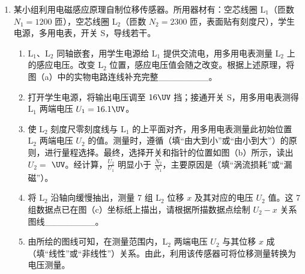 \documentclass[\gkver]{gaokaozhenti}
\begin{document}
\begin{enumerate}
\item
某小组利用电磁感应原理自制位移传感器。所用器材有：空芯线圈 $\mathrm{L}_1$（匝数 $N_1=1200$ 匝），空芯线圈 $\mathrm{L}_2$（匝数 $N_2=2300$ 匝，表面贴有刻度尺），学生电源，多用电表，开关 S，导线若干。
\begin{enumerate}
	\item
	$\mathrm{L}_1$、$\mathrm{L}_2$ 同轴嵌套，用学生电源给 $\mathrm{L}_1$ 提供交流电，用多用电表测量 $\mathrm{L}_2$ 上的感应电压。改变 $\mathrm{L}_2$ 位置，感应电压值会随之改变。根据上述原理，将图（a）中的实物电路连线补充完整\_\_\_\_\_\_\_\_。
	\item
	打开学生电源，将输出电压调至 $16\UV$ 挡；接通开关 S，用多用电表测得 $\mathrm{L}_1$ 两端电压 $U_1=16.1\UV$。
	\item
	使 $\mathrm{L}_2$ 刻度尺零刻度线与 $\mathrm{L}_1$ 的上平面对齐，用多用电表测量此初始位置 $\mathrm{L}_2$ 两端电压 $U_2$ 的值。测量时，遵循（填“由大到小”或“由小到大”）的原则，进行量程选择。最终，选择开关和指针的位置如图（b）所示，读出 $U_2=$ $\UV$。经计算，$\frac{U_2}{U_1}$ 明显小于 $\frac{N_2}{N_1}$，主要原因是（填“涡流损耗”或“漏磁”）。
	\item
	将 $\mathrm{L}_2$ 沿轴向缓慢抽出，测量 7 组 $\mathrm{L}_2$ 位移 $x$ 及其对应的电压 $U_2$ 值。这 7 组数据点已在图（c）坐标纸上描出，请根据所描数据点绘制 $U_2-x$ 关系图线\_\_\_\_\_\_\_\_。
	\item
	由所绘的图线可知，在测量范围内，$\mathrm{L}_2$ 两端电压 $U_2$ 与其位移 $x$ 成（填“线性”或“非线性”）关系。由此，利用该传感器可将位移测量转换为电压测量。
\end{enumerate}
\end{enumerate}
\end{document}
